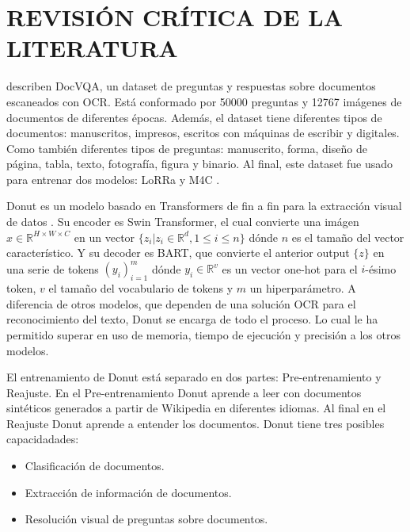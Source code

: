 \documentclass[../main.tex]{subfiles}
\begin{document}
\chapter{REVISIÓN CRÍTICA DE LA LITERATURA}


\citet{mathew2021docvqa} describen DocVQA,
un dataset de preguntas y respuestas sobre documentos escaneados con OCR.
Está conformado por 50000 preguntas y 12767 imágenes de documentos de diferentes épocas.
Además, el dataset tiene diferentes tipos de documentos:
manuscritos, impresos, escritos con máquinas de escribir y digitales.
Como también diferentes tipos de preguntas:
manuscrito, forma, diseño de página, tabla, texto, fotografía, figura y binario.
Al final, este dataset fue usado para entrenar dos modelos:
LoRRa \cite{anderson2018bottomup} y M4C \cite{devlin2019bert}.

%

Donut es un modelo basado en Transformers de fin a fin para la extracción visual de datos \cite{kim2022ocrfree}.
Su encoder es Swin Transformer\cite{9710580}, el cual convierte una imágen $x \in \mathbb{R}^{H\times W \times C}$ en un vector $\{z_i|z_i\in\mathbb{R}^d,1\leq i \leq n\}$ dónde $n$ es el tamaño del vector característico.
Y su decoder es BART\cite{lewis-etal-2020-bart}, que convierte el anterior output $\{z\}$ en una serie de tokens $(y_i)^m_{i=1}$ dónde $y_i\in\mathbb{R}^v$ es un vector one-hot para el $i$-ésimo token, $v$ el tamaño del vocabulario de tokens y $m$ un hiperparámetro.
A diferencia de otros modelos, que dependen de una solución OCR para el reconocimiento del texto,
Donut se encarga de todo el proceso.
Lo cual le ha permitido superar en uso de memoria, tiempo de ejecución y precisión a los otros modelos.

El entrenamiento de Donut está separado en dos partes: Pre-entrenamiento y Reajuste.
En el Pre-entrenamiento Donut aprende a leer con documentos sintéticos generados a partir de Wikipedia en diferentes idiomas.
Al final en el Reajuste Donut aprende a entender los documentos.
Donut tiene tres posibles capacidadades:
\begin{itemize}
	\item Clasificación de documentos.
	\item Extracción de información de documentos.
	\item Resolución visual de preguntas sobre documentos.
\end{itemize}
\end{document}
